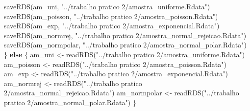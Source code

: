\documentclass[
]{article}
\newenvironment{Shaded}{\begin{snugshade}}{\end{snugshade}}
\newcommand{\ControlFlowTok}[1]{\textcolor[rgb]{0.13,0.29,0.53}{\textbf{#1}}}
\newcommand{\FunctionTok}[1]{\textcolor[rgb]{0.00,0.00,0.00}{#1}}
\newcommand{\NormalTok}[1]{#1}
\newcommand{\OtherTok}[1]{\textcolor[rgb]{0.56,0.35,0.01}{#1}}
\newcommand{\StringTok}[1]{\textcolor[rgb]{0.31,0.60,0.02}{#1}}
\begin{document}
\begin{Shaded}
\begin{Highlighting}[]
  \FunctionTok{saveRDS}\NormalTok{(am\_uni, }\StringTok{"../trabalho pratico 2/amostra\_uniforme.Rdata"}\NormalTok{)}
  \FunctionTok{saveRDS}\NormalTok{(am\_poisson, }\StringTok{"../trabalho pratico 2/amostra\_poisson.Rdata"}\NormalTok{)}
  \FunctionTok{saveRDS}\NormalTok{(am\_exp, }\StringTok{"../trabalho pratico 2/amostra\_exponencial.Rdata"}\NormalTok{)}
  \FunctionTok{saveRDS}\NormalTok{(am\_normrej, }\StringTok{"../trabalho pratico 2/amostra\_normal\_rejeicao.Rdata"}\NormalTok{)}
  \FunctionTok{saveRDS}\NormalTok{(am\_normpolar, }\StringTok{"../trabalho pratico 2/amostra\_normal\_polar.Rdata"}\NormalTok{)}
\NormalTok{\} }\ControlFlowTok{else}\NormalTok{ \{}
\NormalTok{  am\_uni }\OtherTok{\textless{}{-}} \FunctionTok{readRDS}\NormalTok{(}\StringTok{"../trabalho pratico 2/amostra\_uniforme.Rdata"}\NormalTok{)}
\NormalTok{  am\_poisson }\OtherTok{\textless{}{-}} \FunctionTok{readRDS}\NormalTok{(}\StringTok{"../trabalho pratico 2/amostra\_poisson.Rdata"}\NormalTok{)}
\NormalTok{  am\_exp }\OtherTok{\textless{}{-}} \FunctionTok{readRDS}\NormalTok{(}\StringTok{"../trabalho pratico 2/amostra\_exponencial.Rdata"}\NormalTok{)}
\NormalTok{  am\_normrej }\OtherTok{\textless{}{-}} \FunctionTok{readRDS}\NormalTok{(}\StringTok{"../trabalho pratico 2/amostra\_normal\_rejeicao.Rdata"}\NormalTok{)}
\NormalTok{  am\_normpolar }\OtherTok{\textless{}{-}} \FunctionTok{readRDS}\NormalTok{(}\StringTok{"../trabalho pratico 2/amostra\_normal\_polar.Rdata"}\NormalTok{)}
\NormalTok{\}}


\end{Highlighting}
\end{Shaded}
\end{document}
